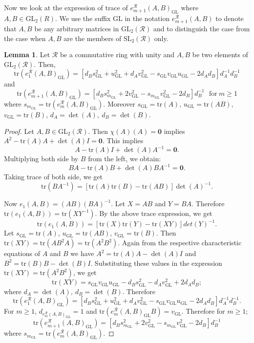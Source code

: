 \documentclass[10pt,twoside]{amsart}
\newcommand{\GL}{\mathrm{GL}}
\newcommand{\SL}{\mathrm{SL}}
\newcommand{\tr}{\mathrm{tr}}
\theoremstyle{definition}
\theoremstyle{definition}
\newtheorem{lemma}[theorem]{Lemma}
\begin{document}
Now we look at the expression of trace of $e_{m+1}^{\mathcal{R}}(A,B)_{\GL}$ where $A,B\in \GL_2(R)$. We use the suffix $\GL$ in the notation $e_{m+1}^{\mathcal{R}}(A,B)$ to denote that $A,B$ be any arbitrary matrices in $ \GL_2(\mathcal{R})$ and to distinguish the case from the case when $A,B$ are the members of $\SL_2(\mathcal{R})$ only.
\begin{lemma}{\label{traceengelinGL}}
    Let $\mathcal{R}$ be a commutative ring with unity and $A, B$ be two elements of $\GL_2(\mathcal{R})$. Then,  $$\tr(e_1^{\mathcal{R}}(A,B)_{\GL}) =[d_Bs_{\GL}^2+u_{\GL}^2+d_Av_{\GL}^2-s_{\GL}v_{\GL}u_{\GL}-2d_Ad_B]d_A^{-1}d_B^{-1}$$ and $$ \tr(e_{m+1}^{\mathcal{R}}(A,B)_{\GL})=[d_Bs_{m_{\GL}}^2+2v_{\GL}^2-s_{m_{\GL}}v_{\GL}^2-2d_B]d_B^{-1}\ \ \ \text{for} \ m\geq 1$$
where $s_{m_{\GL}}=\tr(e_m^{\mathcal{R}}(A,B)_{\GL})$. Moreover $s_{\GL}=\tr(A)$, $u_{\GL}=\tr(AB)$, $v_{\GL}=\tr(B)$, $d_A=\det(A),\ d_B=\det(B)$.
 
\end{lemma}
\begin{proof}
    Let $A,B\in \GL_2(\mathcal{R})$. Then $\chi(A)(A)=\mathbf{0}$ implies $A^2-\tr(A)A+\det(A)I=\mathbf{0}$. This implies $$A-\tr(A)I+\det(A)A^{-1}=\mathbf{0}.$$ Multiplying both side by $B$ from the left, we obtain: $$BA-\tr(A)B+\det(A)BA^{-1}=\mathbf{0}.$$ Taking trace of both side, we get $$\tr(BA^{-1})=[\tr(A)\tr(B)-\tr(AB)]\det(A)^{-1}.$$

Now $e_1(A,B)=(AB)(BA)^{-1}$. Let $X=AB$ and $Y=BA$. Therefore $\tr(e_1(A,B))=\tr(XY^{-1})$. By the above trace expression, we get $$\tr(e_1(A,B))=[\tr(X)\tr(Y)-\tr(XY)]det(Y)^{-1}.$$ Let $s_{\GL}=\tr(A)$, $u_{\GL}=\tr(AB)$, $v_{\GL}=\tr(B)$. Then $\tr(XY)=\tr(AB^2A)=\tr(A^2B^2)$. Again from the respective characteristic equations of $A$ and $B$ we have $A^2=\tr(A)A-\det(A)I$ and $B^2=\tr(B)B-\det(B)I$. Substituting these values in the expression $\tr(XY)=\tr(A^2B^2)$, we get $$\tr(XY)=s_{\GL}v_{\GL}u_{\GL}-d_Bs_{\GL}^2-d_Av_{\GL}^2+2d_Ad_B;$$ where $d_A=\det(A),\ d_B=\det(B)$. Therefore $$\tr(e_1^{\mathcal{R}}(A,B)_{\GL})=[d_Bs_{\GL}^2+u_{\GL}^2+d_Av_{\GL}^2-s_{\GL}v_{\GL}u_{\GL}-2d_Ad_B]d_A^{-1}d_B^{-1}.$$ For $m\geq 1$, $d_{e_m^{\mathcal{R}}(A,B)_{\GL}}=1$ and $\tr(e_m^{\mathcal{R}}(A,B)_{\GL}B)=v_{\GL}$. Therefore for $m\geq 1$;  $$ \tr(e_{m+1}^{\mathcal{R}}(A,B)_{\GL})=[d_Bs_{m_{\GL}}^2+2v_{\GL}^2-s_{m_{\GL}}v_{\GL}^2-2d_B]d_B^{-1}$$
where $s_{m_{\GL}}=\tr(e_m^{\mathcal{R}}(A,B)_{\GL})$.
\end{proof}
\end{document}
